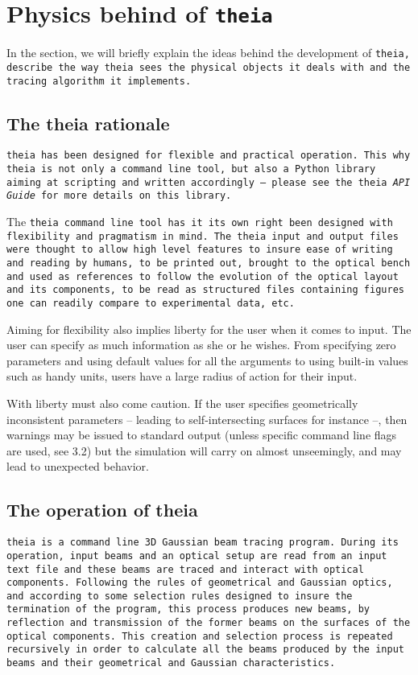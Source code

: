 \documentclass{article}
\begin{document}
\section{Physics behind of \tt{theia}}
In the section, we will briefly explain the ideas behind the development of \tt{theia}, describe the way \tt{theia} sees the physical objects it deals with and the tracing algorithm it implements.

\subsection{The theia rationale}
\tt{theia} has been designed for flexible and practical operation. This why \tt{theia} is not only a command line tool, but also a Python library aiming at scripting and written accordingly -- please see the theia \textit{API Guide} for more details on this library.

The \tt{theia} command line tool has it its own right been designed with flexibility and pragmatism in mind. The \tt{theia} input and output files were thought to allow high level features to insure ease of writing and reading by humans, to be printed out, brought to the optical bench and used as references to follow the evolution of the optical layout and its components, to be read as structured files containing figures one can readily compare to experimental data, etc.

Aiming for flexibility also implies liberty for the user when it comes to input. The user can specify as much information as she or he wishes. From specifying zero parameters and using default values for all the arguments to using built-in values such as handy units, users have a large radius of action for their input.

With liberty must also come caution. If the user specifies geometrically inconsistent parameters -- leading to self-intersecting surfaces for instance --, then warnings may be issued to standard output (unless specific command line flags are used, see 3.2) but the simulation will carry on almost unseemingly, and may lead to unexpected behavior.

\subsection{The operation of theia}
\tt{theia} is a command line 3D Gaussian beam tracing program. During its operation, input beams and an optical setup are read from an input text file and these beams are traced and interact with optical components. Following the rules of geometrical and Gaussian optics, and according to some selection rules designed to insure the termination of the program, this process produces new beams, by reflection and transmission of the former beams on the surfaces of the optical components. This creation and selection process is repeated recursively in order to calculate all the beams produced by the input beams and their geometrical and Gaussian characteristics.
\end{document}

